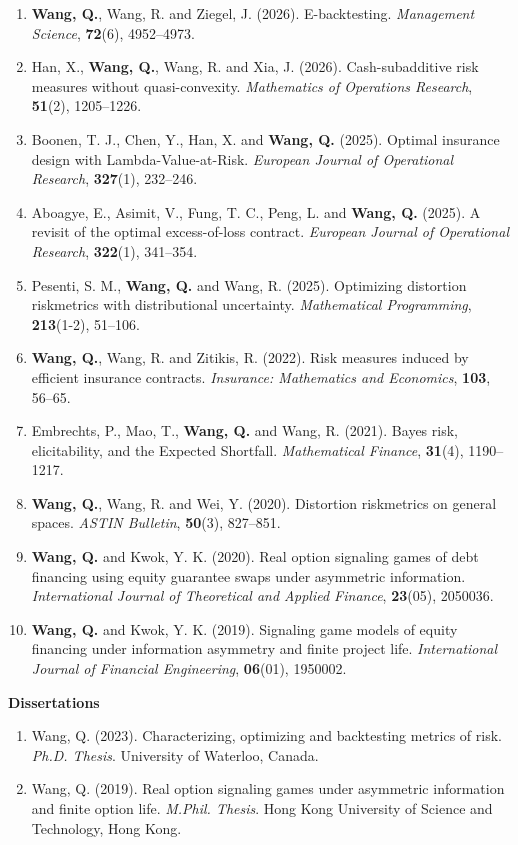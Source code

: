 \documentclass[10pt]{article}
\begin{document}
\begin{enumerate}
  \item \textbf{Wang, Q.}, Wang, R. and Ziegel, J. (2026). E-backtesting. \emph{Management Science}, \textbf{72}(6), 4952--4973.
  \item Han, X., \textbf{Wang, Q.}, Wang, R. and Xia, J. (2026). Cash-subadditive risk measures without quasi-convexity. \emph{Mathematics of Operations Research}, \textbf{51}(2), 1205--1226.
  \item Boonen, T. J., Chen, Y., Han, X. and \textbf{Wang, Q.} (2025). Optimal insurance design with Lambda-Value-at-Risk. \emph{European Journal of Operational Research}, \textbf{327}(1), 232--246.
  \item Aboagye, E., Asimit, V., Fung, T. C., Peng, L. and \textbf{Wang, Q.} (2025). A revisit of the optimal excess-of-loss contract. \emph{European Journal of Operational Research}, \textbf{322}(1), 341--354.
  \item Pesenti, S. M., \textbf{Wang, Q.} and Wang, R. (2025). Optimizing distortion riskmetrics with distributional uncertainty. \emph{Mathematical Programming}, \textbf{213}(1-2), 51--106.
  \item \textbf{Wang, Q.}, Wang, R. and Zitikis, R. (2022). Risk measures induced by efficient insurance contracts. \emph{Insurance: Mathematics and Economics}, \textbf{103}, 56--65.
  \item Embrechts, P., Mao, T., \textbf{Wang, Q.} and Wang, R. (2021). Bayes risk, elicitability, and the Expected Shortfall. \emph{Mathematical Finance}, \textbf{31}(4), 1190--1217.
  \item \textbf{Wang, Q.}, Wang, R. and Wei, Y. (2020). Distortion riskmetrics on general spaces. \emph{ASTIN Bulletin}, \textbf{50}(3), 827--851.
  \item \textbf{Wang, Q.} and Kwok, Y. K. (2020). Real option signaling games of debt financing using equity guarantee swaps under asymmetric information. \emph{International Journal of Theoretical and Applied Finance}, \textbf{23}(05), 2050036.
  \item \textbf{Wang, Q.} and Kwok, Y. K. (2019). Signaling game models of equity financing under information asymmetry and finite project life. \emph{International Journal of Financial Engineering}, \textbf{06}(01), 1950002.
\end{enumerate}

{\bf Dissertations}

\begin{enumerate}
  \item Wang, Q. (2023). Characterizing, optimizing and backtesting metrics of risk. \emph{Ph.D. Thesis}. University of Waterloo, Canada.
  \item Wang, Q. (2019). Real option signaling games under asymmetric information and finite option life. \emph{M.Phil. Thesis}. Hong Kong University of Science and Technology, Hong Kong.
\end{enumerate}
\end{document}
